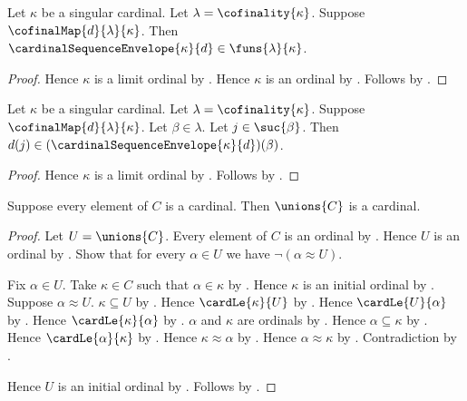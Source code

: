 \begin{proposition}\label{cardinal_sequence_envelope_type}
    Let $\kappa$ be a singular cardinal.
    Let $\lambda=\cofinality{\kappa}$.
    Suppose $\cofinalMap{d}{\lambda}{\kappa}$.
    Then $\cardinalSequenceEnvelope{\kappa}{d}
        \in\funs{\lambda}{\kappa}$.
\end{proposition}
\begin{proof}
    Hence $\kappa$ is a limit ordinal
        by .
    Hence $\kappa$ is an ordinal by .
    Follows by
        .
\end{proof}

\begin{proposition}\label{cardinal_sequence_envelope_dominates}
    Let $\kappa$ be a singular cardinal.
    Let $\lambda=\cofinality{\kappa}$.
    Suppose $\cofinalMap{d}{\lambda}{\kappa}$.
    Let $\beta\in\lambda$.
    Let $j\in\suc{\beta}$.
    Then $d(j)\in(\cardinalSequenceEnvelope{\kappa}{d})(\beta)$.
\end{proposition}
\begin{proof}
    Hence $\kappa$ is a limit ordinal
        by .
    Follows by
        .
\end{proof}

\begin{proposition}\label{union_of_cardinals_is_cardinal}
    Suppose every element of $C$ is a cardinal.
    Then $\unions{C}$ is a cardinal.
\end{proposition}
\begin{proof}
    Let $U=\unions{C}$.
    Every element of $C$ is an ordinal
        by .
    Hence $U$ is an ordinal by .
    Show that for every $\alpha\in U$ we have $\lnot(\alpha\approx U)$.
    \begin{subproof}
        Fix $\alpha\in U$.
        Take $\kappa\in C$ such that $\alpha\in\kappa$
            by .
        Hence $\kappa$ is an initial ordinal by .
        Suppose $\alpha\approx U$.
        $\kappa\subseteq U$ by .
        Hence $\cardLe{\kappa}{U}$ by .
        Hence $\cardLe{U}{\alpha}$ by .
        Hence $\cardLe{\kappa}{\alpha}$
            by .
        $\alpha$ and $\kappa$ are ordinals
            by .
        Hence $\alpha\subseteq\kappa$
            by .
        Hence $\cardLe{\alpha}{\kappa}$
            by .
        Hence $\kappa\approx\alpha$
            by .
        Hence $\alpha\approx\kappa$ by .
        Contradiction by .
    \end{subproof}
    Hence $U$ is an initial ordinal by .
    Follows by .
\end{proof}


